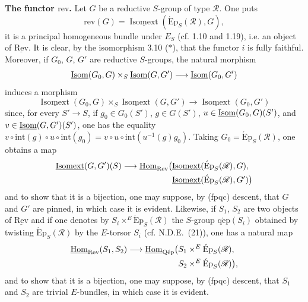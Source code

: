 \label{XXIV.3.11.3}\textbf{The functor $\mathrm{rev}$.}
Let $G$ be a reductive $S$-group of type $\mathscr R$. One puts
\[
\mathrm{rev}(G)=\underline{\operatorname{Isomext}}(\operatorname{\acute Ep}_S(\mathscr R),G),
\]
it is a principal homogeneous bundle under $E_S$ (cf. 1.10 and 1.19), i.e. an object of $\underline{\mathrm{Rev}}$.
\label{XXIV.3.11.4}
It is clear, by the isomorphism 3.10 ($*$), that the functor $i$ is fully faithful. Moreover, if $G_0$, $G$, $G'$ are reductive $S$-groups, the natural morphism
\[
\underline{\operatorname{Isom}}(G_0,G)\times_S\underline{\operatorname{Isom}}(G,G')\longrightarrow\underline{\operatorname{Isom}}(G_0,G')
\]
induces a morphism
\begin{equation}\tag{$\star$}
\underline{\operatorname{Isomext}}(G_0,G)\times_S\underline{\operatorname{Isomext}}(G,G')\to\underline{\operatorname{Isomext}}(G_0,G')
\end{equation}
since, for every $S'\to S$, if $g_0\in G_0(S')$, $g\in G(S')$, $u\in\underline{\operatorname{Isom}}(G_0,G)(S')$, and $v\in\underline{\operatorname{Isom}}(G,G')(S')$, one has the equality $v\circ\mathrm{int}(g)\circ u\circ\mathrm{int}(g_0)=v\circ u\circ\mathrm{int}(u^{-1}(g)g_0)$. Taking $G_0=\operatorname{\acute Ep}_S(\mathscr R)$, one obtains a map
\[
\begin{aligned}
\underline{\operatorname{Isomext}}(G,G')(S)\longrightarrow\underline{\operatorname{Hom}}_{\mathrm{Rev}}\bigl(&\underline{\operatorname{Isomext}}(\operatorname{\acute Ep}_S(\mathscr R),G),\\
&\underline{\operatorname{Isomext}}(\operatorname{\acute Ep}_S(\mathscr R),G')\bigr)
\end{aligned}
\]
and to show that it is a bijection, one may suppose, by (fpqc) descent, that $G$ and $G'$ are pinned, in which case it is evident.
Likewise, if $S_1$, $S_2$ are two objects of $\underline{\mathrm{Rev}}$ and if one denotes by $S_i\times^E\operatorname{\acute Ep}_S(\mathscr R)$ the $S$-group $\mathrm{q\acute ep}(S_i)$ obtained by twisting $\operatorname{\acute Ep}_S(\mathscr R)$ by the $E$-torsor $S_i$ (cf. N.D.E.~(21)), one has a natural map
\[
\begin{aligned}
\underline{\operatorname{Hom}}_{\mathrm{Rev}}(S_1,S_2)\longrightarrow\underline{\operatorname{Hom}}_{\mathrm{Q\acute ep}}\bigl(&S_1\times^E\operatorname{\acute Ep}_S(\mathscr R),\\
&S_2\times^E\operatorname{\acute Ep}_S(\mathscr R)\bigr),
\end{aligned}
\]
and to show that it is a bijection, one may suppose, by (fpqc) descent, that $S_1$ and $S_2$ are trivial $E$-bundles, in which case it is evident.

